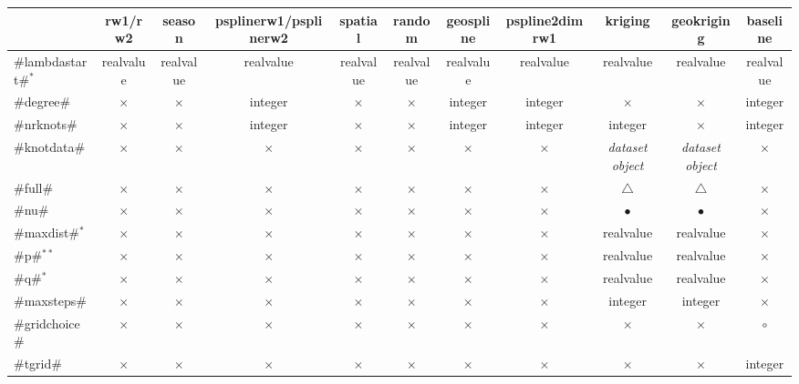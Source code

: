 \begin{sidewaystable} \footnotesize
\begin{tabular}{|l||c|c|c|c|c|c|c|c|c|c|}

\hline
            & rw1/rw2       & season    & psplinerw1/psplinerw2    & spatial & random & geospline & pspline2dimrw1 & kriging  & geokriging & baseline\\
 \hline\hline
 #lambdastart#$^*$  & realvalue   & realvalue   & realvalue   & realvalue   & realvalue   & realvalue   & realvalue & realvalue  & realvalue & realvalue\\
 \hline
 #degree#       & $\times$   & $\times$   &  integer   & $\times$ & $\times$ &  integer &  integer &  $\times$ & $\times$ & integer\\
 \hline
 #nrknots#      & $\times$   & $\times$   &  integer   & $\times$ & $\times$ &  integer &  integer &  integer & $\times$ & integer\\
 \hline
 #knotdata#     & $\times$   & $\times$   &  $\times$   & $\times$ & $\times$ &  $\times$ &  $\times$ & {\em dataset object}& {\em dataset object} & $\times$\\
 \hline
 #full#     & $\times$   & $\times$   &  $\times$   & $\times$ & $\times$ &  $\times$ &  $\times$ &  $\triangle$ & $\triangle$ & $\times$\\
 \hline
 #nu#     & $\times$   & $\times$   &  $\times$   & $\times$ & $\times$ &  $\times$ &  $\times$ &  $\bullet$ &  $\bullet$ & $\times$\\
 \hline
 #maxdist#$^*$     & $\times$   & $\times$   &  $\times$   & $\times$ & $\times$ &  $\times$ &  $\times$ &  realvalue &  realvalue &  $\times$\\
 \hline
 #p#$^{**}$     & $\times$   & $\times$   &  $\times$   & $\times$ & $\times$ &  $\times$ &  $\times$ &  realvalue &  realvalue &  $\times$\\
 \hline
 #q#$^*$     & $\times$   & $\times$   &  $\times$   & $\times$ & $\times$ &  $\times$ &  $\times$ &  realvalue &  realvalue &  $\times$\\
 \hline
 #maxsteps#     & $\times$   & $\times$   &  $\times$   & $\times$ & $\times$ &  $\times$ &  $\times$ &  integer  &  integer & $\times$\\
 \hline
 #gridchoice#   & $\times$  & $\times$  & $\times$  & $\times$  & $\times$  & $\times$  & $\times$  & $\times$  & $\times$ & $\circ$\\
 \hline
 #tgrid#   & $\times$  & $\times$  & $\times$  & $\times$  & $\times$  & $\times$  & $\times$  & $\times$  & $\times$ & integer\\

\end{tabular}
\end{sidewaystable}
